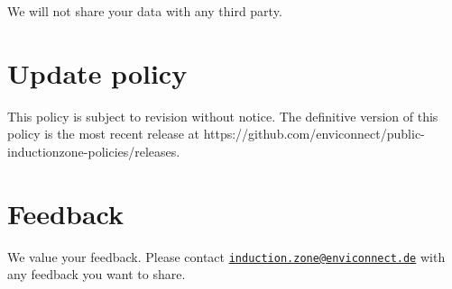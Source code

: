 \documentclass[
  10pt,
  a4paper,
]{article}
\begin{document}
We will not share your data with any third party.

\hypertarget{update-policy}{%
\section{Update policy}\label{update-policy}}

This policy is subject to revision without notice. The definitive
version of this policy is the most recent release at
https://github.com/enviconnect/public-inductionzone-policies/releases.

\hypertarget{feedback}{%
\section{Feedback}\label{feedback}}

We value your feedback. Please contact
\href{mailto:induction.zone@enviconnect.de}{\nolinkurl{induction.zone@enviconnect.de}}
with any feedback you want to share.
\end{document}
